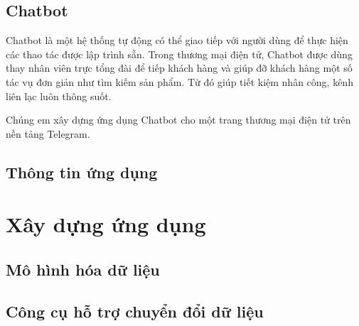 \subsection{Chatbot}
	Chatbot là một hệ thống tự động có thể giao tiếp với người dùng để thực hiện các thao tác được lập trình sẵn.  Trong thương mại điện tử, Chatbot được dùng thay nhân viên trực tổng đài để tiếp khách hàng và giúp đỡ khách hàng một số tác vụ đơn giản như tìm kiếm sản phẩm. Từ đó giúp tiết kiệm nhân công, kênh liên lạc luôn thông suốt.
	
    Chúng em xây dựng ứng dụng Chatbot cho một trang thương mại điện tử trên nền tảng Telegram. 


\subsection{Thông tin ứng dụng}










\section{Xây dựng ứng dụng}

\subsection{Mô hình hóa dữ liệu}

\subsection{Công cụ hỗ trợ chuyển đổi dữ liệu}

